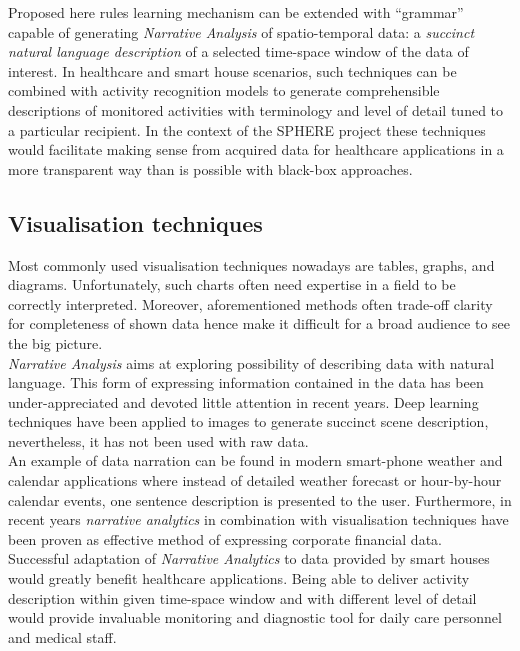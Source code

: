 \documentclass[12pt, a4paper, pdflatex, leqno, twoside, openright]{report}
\begin{document}
Proposed here rules learning mechanism can be extended with ``grammar'' capable of generating \emph{Narrative Analysis} of spatio-temporal data: a \emph{succinct natural language description} of a selected time-space window of the data of interest. In healthcare and smart house scenarios, such techniques can be combined with activity recognition models to generate comprehensible descriptions of monitored activities with terminology and level of detail tuned to a particular recipient. In the context of the SPHERE project these techniques would facilitate making sense from acquired data for healthcare applications in a more transparent way than is possible with black-box approaches.

    \subsection{Visualisation techniques}
Most commonly used visualisation techniques nowadays are tables, graphs, and diagrams. Unfortunately, such charts often need expertise in a field to be correctly interpreted. Moreover, aforementioned methods often trade-off clarity for completeness of shown data hence make it difficult for a broad audience to see the big picture.\\

\emph{Narrative Analysis} aims at exploring possibility of describing data with natural language. This form of expressing information contained in the data has been under-appreciated and devoted little attention in recent years. Deep learning techniques have been applied to images to generate succinct scene description, nevertheless, it has not been used with raw data.\\
An example of data narration can be found in modern smart-phone weather and calendar applications where instead of detailed weather forecast or hour-by-hour calendar events, one sentence description is presented to the user. Furthermore, in recent years \emph{narrative analytics} in combination with visualisation techniques have been proven as effective method of expressing corporate financial data.\\

Successful adaptation of \emph{Narrative Analytics} to data provided by smart houses would greatly benefit healthcare applications. Being able to deliver activity description within given time-space window and with different level of detail would provide invaluable monitoring and diagnostic tool for daily care personnel and medical staff.
\end{document}
